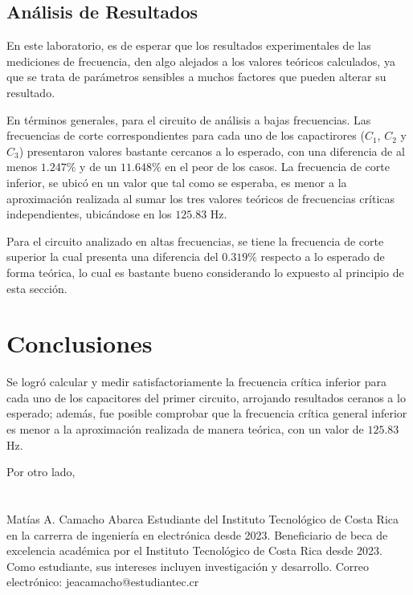 \documentclass[journal]{IEEEtran}
\begin{document}
\subsection{Análisis de Resultados}
En este laboratorio, es de esperar que los resultados experimentales de las mediciones de frecuencia, den algo alejados
a los valores teóricos calculados, ya que se trata de parámetros sensibles a muchos factores que pueden alterar
su resultado. 

En términos generales, para el circuito de análisis a bajas frecuencias. Las frecuencias de corte correspondientes para cada uno
de los capactirores ($C_1$, $C_2$ y $C_3$) presentaron valores bastante cercanos a lo esperado, con una diferencia de al menos $1.247\%$ 
y de un $11.648\%$ en el peor de los casos. La frecuencia de corte inferior, se ubicó en un valor que tal como se esperaba, es menor 
a la aproximación realizada al sumar los tres valores teóricos de frecuencias críticas independientes, ubicándose en los $125.83$ $\mathrm{Hz}$. 

Para el circuito analizado en altas frecuencias, se tiene la frecuencia de corte superior la cual presenta una diferencia del $0.319\%$ 
respecto a lo esperado de forma teórica, lo cual es bastante bueno considerando lo expuesto al principio de esta sección. 


\section{Conclusiones}
Se logró calcular y medir satisfactoriamente la frecuencia crítica inferior para cada uno de los capacitores del primer circuito, 
arrojando resultados ceranos a lo esperado; además, fue posible comprobar que la frecuencia crítica general inferior es menor a la 
aproximación realizada de manera teórica, con un valor de $125.83$ $\mathrm{Hz}$.

Por otro lado, 
\appendices

\section{}

\begin{IEEEbiographynophoto}{Matías A. Camacho Abarca}
        Estudiante del Instituto Tecnológico de Costa Rica en la carrerra de ingeniería en electrónica desde
        2023. Beneficiario de beca de excelencia académica por el Instituto Tecnológico de
        Costa Rica desde 2023. Como estudiante, sus
        intereses incluyen investigación y desarrollo.
        Correo electrónico: jeacamacho@estudiantec.cr
\end{IEEEbiographynophoto}
\end{document}
